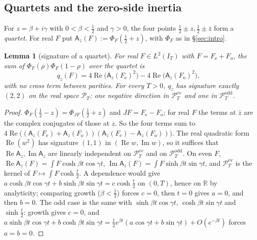 \documentclass[11pt]{amsart}
\newtheorem{lemma}[theorem]{Lemma}
\theoremstyle{definition}
\theoremstyle{remark}
\newcommand{\R}{\mathbb R}
\newcommand{\Rel}{\operatorname{Re}}
\newcommand{\Iml}{\operatorname{Im}}
\newcommand{\PT}{\mathcal P_T}
\newcommand{\IT}{I_T}
\begin{document}
\subsection{Quartets and the zero-side inertia}
For $z=\beta+i\gamma$ with $0<\beta<\frac12$ and $\gamma>0$, the four points $\frac12\pm z,\frac12\pm\bar z$ form a
\emph{quartet}. For real $F$ put $\mathsf A_z(F):=\Phi_F(\frac12+z)$, with $\Phi_F$ as in \S\ref{sec:intro}.

\begin{lemma}[signature of a quartet]\label{thm:inertia-quartet}
For real $F\in L^2(\IT)$ with $F=F_{\mathrm e}+F_{\mathrm o}$, the sum of $\Phi_F(\rho)\Phi_F(1-\rho)$ over the quartet is
\[
q_z(F)=4\Rel\big(\mathsf A_z(F_{\mathrm e})^2\big)-4\Rel\big(\mathsf A_z(F_{\mathrm o})^2\big),
\]
with no cross term between parities. For every $T>0$, $q_z$ has signature exactly $(2,2)$ on the real space $\PT$:
one negative direction in $\PT^{\mathrm{ev}}$ and one in $\PT^{\mathrm{odd}}$.
\end{lemma}
\begin{proof}
$\Phi_F(\frac12-z)=\Phi_{JF}(\frac12+z)$ and $JF=F_{\mathrm e}-F_{\mathrm o}$; for real $F$ the terms at $\bar z$ are the complex
conjugates of those at $z$. So the four terms sum to
$4\Rel\big((\mathsf A_z(F_{\mathrm e})+\mathsf A_z(F_{\mathrm o}))(\mathsf A_z(F_{\mathrm e})-\mathsf A_z(F_{\mathrm o}))\big)$. The real
quadratic form $\Rel(w^2)$ has signature $(1,1)$ in $(\Rel w,\Iml w)$, so it suffices that $\Rel\mathsf A_z,\Iml\mathsf A_z$ are
linearly independent on $\PT^{\mathrm{ev}}$ and on $\PT^{\mathrm{odd}}$. On even $F$, $\Rel\mathsf A_z(F)=\int F\cosh\beta t\cos\gamma t$,
$\Iml\mathsf A_z(F)=\int F\sinh\beta t\sin\gamma t$, and $\PT^{\mathrm{ev}}$ is the kernel of $F\mapsto\int F\cosh\frac t2$. A
dependence would give $a\cosh\beta t\cos\gamma t+b\sinh\beta t\sin\gamma t=c\cosh\frac t2$ on $(0,T)$, hence on $\R$ by
analyticity; comparing growth ($\beta<\frac12$) forces $c=0$, then $t=0$ gives $a=0$, and then $b=0$. The odd case
is the same with $\sinh\beta t\cos\gamma t$, $\cosh\beta t\sin\gamma t$ and $\sinh\frac t2$: growth gives $c=0$, and
$a\sinh\beta t\cos\gamma t+b\cosh\beta t\sin\gamma t=\frac12e^{\beta t}(a\cos\gamma t+b\sin\gamma t)+O(e^{-\beta t})$ forces $a=b=0$.
\end{proof}
\end{document}
